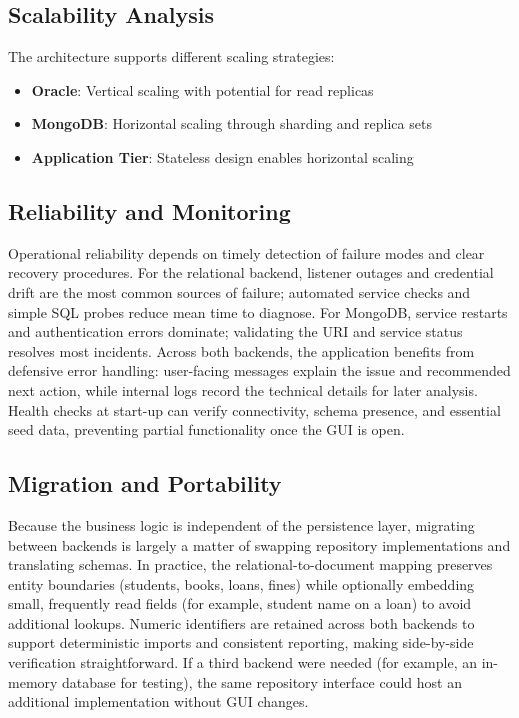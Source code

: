 \documentclass[12pt,a4paper]{article}
\begin{document}
\subsection{Scalability Analysis}

The architecture supports different scaling strategies:
\begin{itemize}
    \item \textbf{Oracle}: Vertical scaling with potential for read replicas
    \item \textbf{MongoDB}: Horizontal scaling through sharding and replica sets
    \item \textbf{Application Tier}: Stateless design enables horizontal scaling
\end{itemize}

\subsection{Reliability and Monitoring}

Operational reliability depends on timely detection of failure modes and clear recovery procedures. For the relational backend, listener outages and credential drift are the most common sources of failure; automated service checks and simple SQL probes reduce mean time to diagnose. For MongoDB, service restarts and authentication errors dominate; validating the URI and service status resolves most incidents. Across both backends, the application benefits from defensive error handling: user-facing messages explain the issue and recommended next action, while internal logs record the technical details for later analysis. Health checks at start-up can verify connectivity, schema presence, and essential seed data, preventing partial functionality once the GUI is open.

\subsection{Migration and Portability}

Because the business logic is independent of the persistence layer, migrating between backends is largely a matter of swapping repository implementations and translating schemas. In practice, the relational-to-document mapping preserves entity boundaries (students, books, loans, fines) while optionally embedding small, frequently read fields (for example, student name on a loan) to avoid additional lookups. Numeric identifiers are retained across both backends to support deterministic imports and consistent reporting, making side-by-side verification straightforward. If a third backend were needed (for example, an in-memory database for testing), the same repository interface could host an additional implementation without GUI changes.
\end{document}
